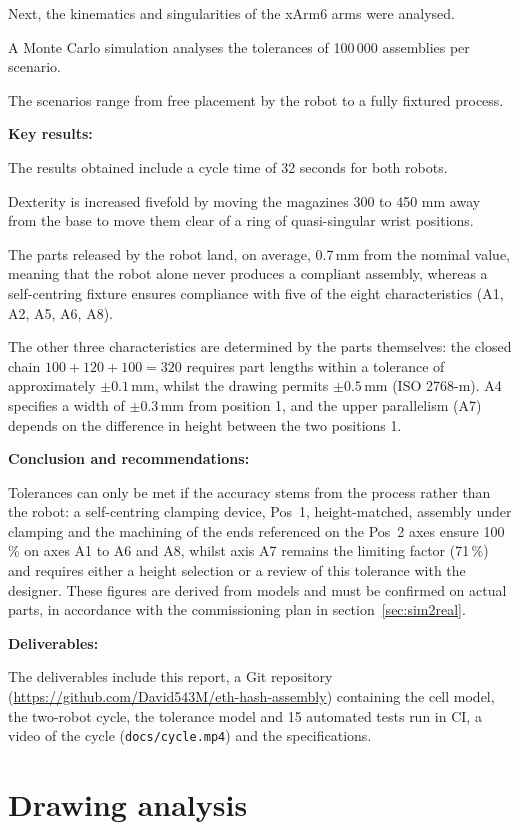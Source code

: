 \documentclass[11pt,a4paper]{article}
\newcommand{\code}[1]{\texttt{#1}}
\newcommand{\repo}{\url{https://github.com/David543M/eth-hash-assembly}}
\begin{document}
Next, the kinematics and singularities of the xArm6 arms were analysed.

A Monte Carlo simulation analyses the tolerances of 100\,000 assemblies per scenario.

The scenarios range from free placement by the robot to a fully fixtured process.

\textbf{Key results:} 

The results obtained include a cycle time of 32 seconds for both robots.

Dexterity is increased fivefold by moving the magazines 300 to 450 mm away from the base to move them clear of a ring of quasi-singular wrist positions.

The parts released by the robot land, on average, 0.7\,mm from the nominal value,
meaning that the robot alone never produces a compliant assembly, whereas a self-centring fixture ensures compliance with five of the eight characteristics (A1, A2, A5, A6, A8). 

The other three characteristics are determined by the parts themselves: the closed chain $100 + 120 + 100 = 320$ requires part lengths
within a tolerance of approximately $\pm0.1$\,mm, whilst the drawing permits $\pm0.5$\,mm (ISO 2768-m).
A4 specifies a width of $\pm0.3$\,mm from position 1, and the upper parallelism (A7) depends on the difference in height
between the two positions 1.


\textbf{Conclusion and recommendations:} 

Tolerances can only be met if the accuracy stems from the process rather than the robot: a self-centring clamping device, Pos~1, height-matched, assembly under clamping and the machining of the ends referenced on the Pos~2 axes ensure 100\,\% on axes A1 to A6 and A8, whilst axis A7 remains the limiting factor (71\,\%) and requires either a height selection or a review of this tolerance with the designer. These figures are derived from models and must be confirmed on actual parts, in accordance with the commissioning plan in section~\ref{sec:sim2real}.

\textbf{Deliverables:} 

The deliverables include this report, a Git repository (\repo) containing the cell model, the
two-robot cycle, the tolerance model and 15 automated tests run in CI, a video of the cycle
(\code{docs/cycle.mp4}) and the specifications.

\section{Drawing analysis}
\end{document}
